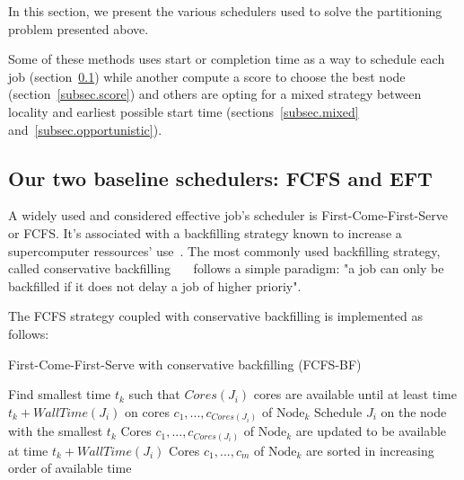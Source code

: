 \documentclass[conference,10pt]{IEEEtran}
\newcommand{\Node}[1]{\ensuremath{\mathrm{Node}_{#1}}\xspace}
\newcommand{\core}{\mathit{Cores}\xspace}
\newcommand{\walltime}{\mathit{WallTime}\xspace}
\newcommand{\nodeset}{\ensuremath{\mathbb{N}}\xspace}
\begin{document}
In this section, we present the various schedulers used to solve
the partitioning problem presented above. 

Some of these methods uses start or completion time as a way to
schedule each job (section~\ref{subsec.fcfs_eft}) while another compute 
a score to choose the best node (section~\ref{subsec.score}) and others
are opting for a mixed strategy between locality and earliest possible start time
(sections~\ref{subsec.mixed} and~\ref{subsec.opportunistic}).

\subsection{Our two baseline schedulers: FCFS and EFT}\label{subsec.fcfs_eft}

A widely used and considered effective job's scheduler is 
First-Come-First-Serve or FCFS.
It's associated with a backfilling strategy known to increase
a supercomputer ressources' use~\cite{maui}. 
The most commonly used backfilling strategy, called conservative 
backfilling~\cite{Characterization_of_Backfilling}~\cite{slurm_website_scheduling}~\cite{Introducing-New-Backfill-based} follows
a simple paradigm: "a job can only be backfilled if it does not
delay a job of higher prioriy".


The FCFS strategy coupled with conservative backfilling is implemented as follows:	
\begin{algorithm}[htbp]
\caption{First-Come-First-Serve with conservative backfilling (FCFS-BF)}\label{algo.fcfsbf}
\begin{algorithmic}[1]
	 
		\ForEach{$\Node{k} \in \nodeset$}
			\State Find smallest time $t_k$ such that $\core(J_i)$ cores are available until at least time $t_k + \walltime(J_i)$ on cores $c_1, ..., c_{\core(J_i)}$ of $\Node{k}$
		\EndFor
		\State Schedule $J_i$ on the node with the smallest $t_k$
		\State Cores $c_1, ..., c_{\core(J_i)}$ of $\Node{k}$ are updated to be available at time $t_k + \walltime(J_i)$
		\State Cores $c_1, ..., c_m$ of $\Node{k}$ are sorted in increasing order of available time 
	\EndFor
	\end{algorithmic}
\end{algorithm}
\end{document}
